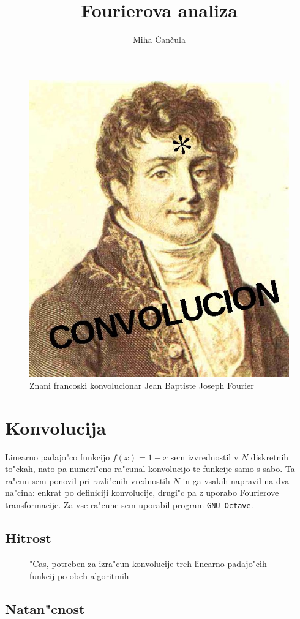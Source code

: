 \documentclass[a4paper,10pt]{article}
\title{Fourierova analiza}
\author{Miha \v Can\v cula}
\begin{document}
  \maketitle

\begin{figure}[h]
  \centering
  \includegraphics[width=.5\textwidth]{Convolucion}
  \caption{Znani francoski konvolucionar Jean Baptiste Joseph Fourier}
\end{figure}

\section{Konvolucija}

Linearno padajo"co funkcijo $f(x) = 1-x$ sem izvrednostil v $N$ diskretnih to"ckah, nato pa numeri"cno ra"cunal konvolucijo te funkcije samo s sabo. Ta ra"cun sem ponovil pri razli"cnih vrednostih $N$ in ga vsakih napravil na dva na"cina: enkrat po definiciji konvolucije, drugi"c pa z uporabo Fourierove transformacije. Za vse ra"cune sem uporabil program \texttt{GNU Octave}. 

\subsection{Hitrost}

\begin{figure}[h]
 \centering

\caption{"Cas, potreben za izra"cun konvolucije treh linearno padajo"cih funkcij po obeh algoritmih}
\end{figure}

\subsection{Natan"cnost}
\end{document}
